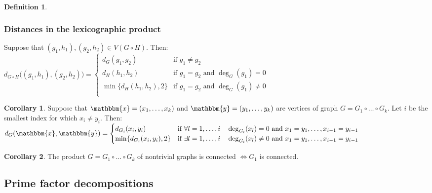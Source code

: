 \documentclass{article}
\theoremstyle{definition}
\newtheorem{corollary}{Corollary}[section]
\newtheorem{dd}{Definition}[section]
\begin{document}
\begin{dd}
\begin{multicols}{2}
\begin{itemize}
{
        }
    \end{itemize}
    \end{multicols}
\end{dd}

\subsubsection{Distances in the lexicographic product}
Suppose that $(g_1, h_1), (g_2, h_2) \in V(G \circ H)$. Then: \\
$d_{G \circ H}\bigl((g_1, h_1), (g_2, h_2)\bigr) = \begin{cases}
    d_G(g_1, g_2) & \text{if } g_1 \neq g_2 \\
    d_H(h_1, h_2) & \text{if } g_1 = g_2 \text{ and } \deg_G(g_1) = 0 \\
    \min\{d_H(h_1, h_2), 2\} & \text{if } g_1 = g_2 \text{ and } \deg_G(g_1) \neq 0 \\
\end{cases}$

\begin{corollary}
    Suppose that $\mathbbm{x} = (x_1, \dots, x_k)$ and $\mathbbm{y} = (y_1, \dots, y_k)$ are vertices of graph $G = G_1 \circ \dots \circ G_k$. Let $i$ be the smallest index for which $x_i \neq y_i$. Then: \\
    $d_G(\mathbbm{x}, \mathbbm{y}) = \begin{cases}
        d_{G_i}(x_i, y_i) & \text{if } \forall l = 1, \dots, i \quad \deg_{G_l}(x_l) = 0 \text{ and } x_1 = y_1, \dots, x_{i - 1} = y_{i - 1} \\
        \min\{d_{G_i}(x_i, y_i), 2\} & \text{if } \exists l = 1, \dots, i \quad \deg_{G_l}(x_l) \neq 0 \text{ and } x_1 = y_1, \dots, x_{i - 1} = y_{i - 1} \\
    \end{cases}$
\end{corollary}

\begin{corollary}
    The product $G = G_1 \circ \dots \circ G_k$ of nontrivial graphs is connected $\iff G_1$ is connected.
\end{corollary}

\subsection{Prime factor decompositions}
\end{document}
